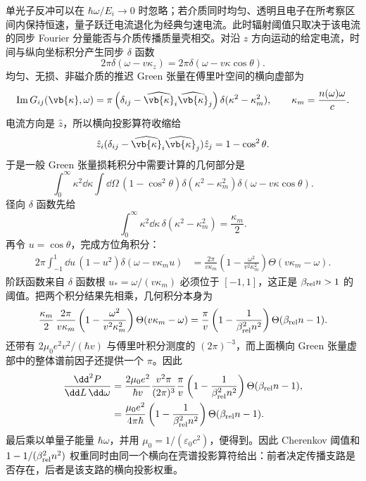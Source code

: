 \begin{exbox}[Cherenkov 辐射]
单光子反冲可以在 $\hbar\omega/E_i\to0$ 时忽略；若介质同时均匀、透明且电子在所考察区间内保持恒速，量子跃迁电流退化为经典匀速电流。此时辐射阈值只取决于该电流的同步 Fourier 分量能否与介质传播质量壳相交。对沿 $z$ 方向运动的给定电流，时间与纵向坐标积分产生同步 $\delta$ 函数
\begin{equation*}
2\pi\delta(\omega-v\kappa_z)
=2\pi\delta(\omega-v\kappa\cos\theta).
\end{equation*}
均匀、无损、非磁介质的推迟 Green 张量在傅里叶空间的横向虚部为
\begin{equation*}
\operatorname{Im}G_{ij}(\vb{\kappa},\omega)
=\pi\left(\delta_{ij}-\widehat{\vb{\kappa}}_i\widehat{\vb{\kappa}}_j\right)
\delta(\kappa^2-\kappa_m^2),
\qquad
\kappa_m=\frac{n(\omega)\omega}{c}.
\end{equation*}
电流方向是 $\hat z$，所以横向投影算符收缩给
\begin{equation*}
\hat z_i(\delta_{ij}-\widehat{\vb{\kappa}}_i\widehat{\vb{\kappa}}_j)\hat z_j
=1-\cos^2\theta.
\end{equation*}
于是一般 Green 张量损耗积分中需要计算的几何部分是
\begin{equation*}
\int_0^\infty \kappa^2\dd\kappa\int\dd\Omega\,
(1-\cos^2\theta)
\delta(\kappa^2-\kappa_m^2)
\delta(\omega-v\kappa\cos\theta).
\end{equation*}
径向 $\delta$ 函数先给
\begin{equation*}
\int_0^\infty \kappa^2\dd\kappa\,\delta(\kappa^2-\kappa_m^2)
=\frac{\kappa_m}{2}.
\end{equation*}
再令 $u=\cos\theta$，完成方位角积分：
\begin{align*}
2\pi\int_{-1}^{1}\dd u\,(1-u^2)
\delta(\omega-v\kappa_m u)
&=\frac{2\pi}{v\kappa_m}
\left(1-\frac{\omega^2}{v^2\kappa_m^2}\right)
\Theta(v\kappa_m-\omega).
\end{align*}
阶跃函数来自 $\delta$ 函数根
$u_*=\omega/(v\kappa_m)$ 必须位于 $[-1,1]$，这正是 $\beta_{\rm rel}n>1$ 的阈值。把两个积分结果先相乘，几何积分本身为
\begin{equation*}
\frac{\kappa_m}{2}\,
\frac{2\pi}{v\kappa_m}
\left(1-\frac{\omega^2}{v^2\kappa_m^2}\right)
\Theta(v\kappa_m-\omega)
=\frac{\pi}{v}
\left(1-\frac1{\beta_{\rm rel}^2n^2}\right)
\Theta(\beta_{\rm rel}n-1).
\end{equation*}
 还带有
$2\mu_0e^2v^2/(\hbar v)$ 与傅里叶积分测度的 $(2\pi)^{-3}$，而上面横向 Green 张量虚部中的整体谱前因子还提供一个 $\pi$。因此
\begin{align*}
\frac{\dd^2 P}{\dd L\,\dd\omega}
&=\frac{2\mu_0e^2}{\hbar v}
\frac{v^2\pi}{(2\pi)^3}
\frac{\pi}{v}
\left(1-\frac1{\beta_{\rm rel}^2n^2}\right)
\Theta(\beta_{\rm rel}n-1),\\
&=\frac{\mu_0e^2}{4\pi\hbar}
\left(1-\frac1{\beta_{\rm rel}^2n^2}\right)
\Theta(\beta_{\rm rel}n-1).
\end{align*}
最后乘以单量子能量 $\hbar\omega$，并用
$\mu_0=1/(\varepsilon_0c^2)$，便得到。因此 Cherenkov 阈值和 $1-1/(\beta_{\rm rel}^2n^2)$ 权重同时由同一个横向在壳谱投影算符给出：前者决定传播支路是否存在，后者是该支路的横向投影权重。
\end{exbox}

